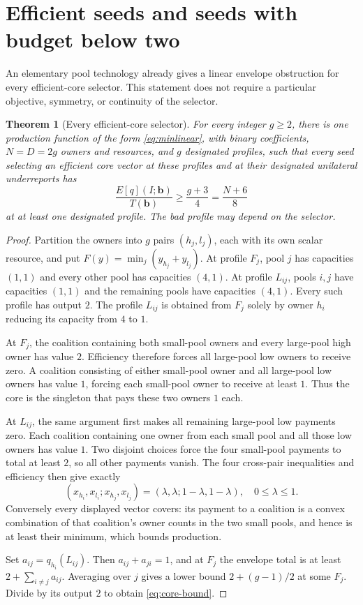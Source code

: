\documentclass[11pt]{article}
\newtheorem{theorem}{Theorem}[section]
\theoremstyle{definition}
\theoremstyle{remark}
\begin{document}
\section{Efficient seeds and seeds with budget below two}
\label{sec:pool-barriers}

An elementary pool technology already gives a linear envelope obstruction
for every efficient-core selector.  This statement does not require a
particular objective, symmetry, or continuity of the selector.

\begin{theorem}[Every efficient-core selector]
\label{thm:core-barrier}
For every integer $g\ge2$, there is one production function of the form
\eqref{eq:minlinear}, with binary coefficients, $N=D=2g$ owners and
resources, and $g$ designated profiles, such that every seed selecting an
efficient core vector at these profiles and at their designated unilateral
underreports has
\begin{equation}
 \frac{E[q](I;\mathbf b)}{T(\mathbf b)}
 \ge \frac{g+3}{4}=\frac{N+6}{8}
 \label{eq:core-bound}
\end{equation}
at at least one designated profile.  The bad profile may depend on the
selector.
\end{theorem}
\begin{proof}
Partition the owners into $g$ pairs $(h_j,l_j)$, each with its own scalar
resource, and put
$F(y)=\min_j(y_{h_j}+y_{l_j})$.
At profile $F_j$, pool $j$ has capacities $(1,1)$ and every other pool has
capacities $(4,1)$.  At profile $L_{ij}$, pools $i,j$ have capacities
$(1,1)$ and the remaining pools have capacities $(4,1)$.  Every such
profile has output $2$.  The profile $L_{ij}$ is obtained from $F_j$ solely
by owner $h_i$ reducing its capacity from $4$ to $1$.

At $F_j$, the coalition containing both small-pool owners and every
large-pool high owner has value $2$.  Efficiency therefore forces all
large-pool low owners to receive zero.  A coalition consisting of either
small-pool owner and all large-pool low owners has value $1$, forcing each
small-pool owner to receive at least $1$.  Thus the core is the singleton
that pays these two owners $1$ each.

At $L_{ij}$, the same argument first makes all remaining large-pool low
payments zero.  Each coalition containing one owner from each small pool
and all those low owners has value $1$.  Two disjoint choices force the
four small-pool payments to total at least $2$, so all other payments
vanish.  The four cross-pair inequalities and efficiency then give exactly
\[
 (x_{h_i},x_{l_i};x_{h_j},x_{l_j})
       =(\lambda,\lambda;1-\lambda,1-\lambda),\quad 0\le\lambda\le1.
\]
Conversely every displayed vector covers: its payment to a coalition is
a convex combination of that coalition's owner counts in the two small
pools, and hence is at least their minimum, which bounds production.

Set $a_{ij}=q_{h_i}(L_{ij})$.  Then $a_{ij}+a_{ji}=1$, and at $F_j$
the envelope total is at least $2+\sum_{i\ne j}a_{ij}$.  Averaging over
$j$ gives a lower bound $2+(g-1)/2$ at some $F_j$.  Divide by its output
$2$ to obtain \eqref{eq:core-bound}.
\end{proof}
\end{document}
